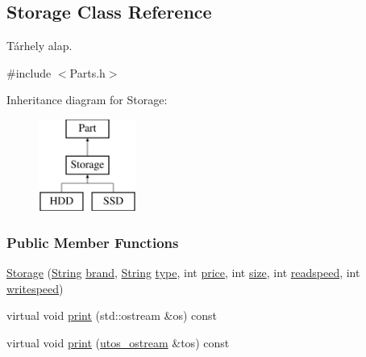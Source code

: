 \subsection{Storage Class Reference}
\label{class_storage}


Tárhely alap.  




{\ttfamily \#include $<$Parts.\+h$>$}

Inheritance diagram for Storage\+:\begin{figure}[H]
\begin{center}
\leavevmode
\includegraphics[height=3.000000cm]{class_storage}
\end{center}
\end{figure}
\subsubsection*{Public Member Functions}
\begin{DoxyCompactItemize}
\item 
\mbox{\hyperlink{class_storage_a502a2ec76e09d48a87da6ed1b91cdaa8}{Storage}} (\mbox{\hyperlink{class_string}{String}} \mbox{\hyperlink{class_part_ae06f2fdeb7fbbdb229a7aca151f3e341}{brand}}, \mbox{\hyperlink{class_string}{String}} \mbox{\hyperlink{class_part_a101dbcc5c4b21564df7414c7eb0eae88}{type}}, int \mbox{\hyperlink{class_part_a8e71223aed1da95a974f33d8d6c91bb1}{price}}, int \mbox{\hyperlink{class_storage_abcc80ce58a21fa884035617ee0b6cb67}{size}}, int \mbox{\hyperlink{class_storage_a41073842ff16961dad3903e6dd49bb0c}{readspeed}}, int \mbox{\hyperlink{class_storage_a0198a1483ccf849d48c76da88599ba8b}{writespeed}})
\item 
virtual void \mbox{\hyperlink{class_storage_aa9f6ffb0fd45839b54bd4e254270445d}{print}} (std\+::ostream \&os) const
\item 
virtual void \mbox{\hyperlink{class_storage_ab7ecf9e0777891b4e1a84bbf391a1cd4}{print}} (\mbox{\hyperlink{structutos__ostream}{utos\+\_\+ostream}} \&tos) const
\end{DoxyCompactItemize}
